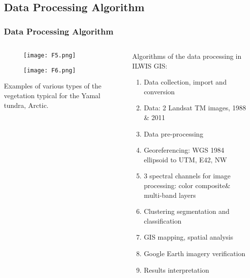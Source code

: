 \documentclass[pdflatex,compress,9pt,
	xcolor={dvipsnames,dvipsnames,svgnames,x11names,table},
	hyperref={colorlinks = true,breaklinks = true, urlcolor = NavyBlue, breaklinks = true}]{beamer}
\begin{document}
\subsection{Data Processing Algorithm} 
\begin{frame}\frametitle{Data Processing Algorithm}
\begin{minipage}[0.4\textheight]{\textwidth}
\begin{columns}[T]
\begin{column}{0.5\textwidth}
\vspace{2em}
\begin{figure}[H]
	\centering
		\texttt{[image: F5.png]}
\end{figure}
\begin{figure}[H]
	\centering
		\texttt{[image: F6.png]}
\end{figure}
Examples of various types of the vegetation typical for the Yamal tundra, Arctic.
\end{column}
\begin{column}{0.5\textwidth}
Algorithms of the data processing in ILWIS GIS: 
\begin{enumerate}[i]
            \item Data collection, import and conversion
            \item Data: 2 Landsat TM images, 1988 \& 2011
            \item Data pre-processing 
            \item Georeferencing: WGS 1984 ellipsoid to UTM, E42, NW
            \item 3 spectral channels for image processing: color composite\& multi-band layers
            \item Clustering segmentation and classification
            \item GIS mapping, spatial analysis
            \item Google Earth imagery verification
            \item Results interpretation
\end{enumerate}
\end{column}
\end{columns}
\end{minipage}
\end{frame}
\end{document}
